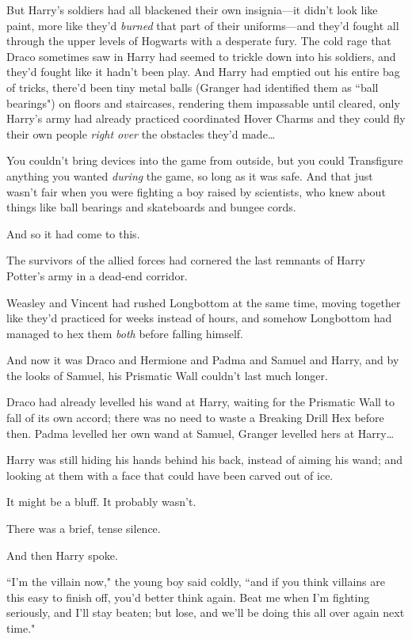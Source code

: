 But Harry's soldiers had all blackened their own insignia—it didn't look like paint, more like they'd \emph{burned} that part of their uniforms—and they'd fought all through the upper levels of Hogwarts with a desperate fury. The cold rage that Draco sometimes saw in Harry had seemed to trickle down into his soldiers, and they'd fought like it hadn't been play. And Harry had emptied out his entire bag of tricks, there'd been tiny metal balls (Granger had identified them as ``ball bearings") on floors and staircases, rendering them impassable until cleared, only Harry's army had already practiced coordinated Hover Charms and they could fly their own people \emph{right over} the obstacles they'd made{\ldots}

You couldn't bring devices into the game from outside, but you could Transfigure anything you wanted \emph{during} the game, so long as it was safe. And that just wasn't fair when you were fighting a boy raised by scientists, who knew about things like ball bearings and skateboards and bungee cords.

And so it had come to this.

The survivors of the allied forces had cornered the last remnants of Harry Potter's army in a dead-end corridor.

Weasley and Vincent had rushed Longbottom at the same time, moving together like they'd practiced for weeks instead of hours, and somehow Longbottom had managed to hex them \emph{both} before falling himself.

And now it was Draco and Hermione and Padma and Samuel and Harry, and by the looks of Samuel, his Prismatic Wall couldn't last much longer.

Draco had already levelled his wand at Harry, waiting for the Prismatic Wall to fall of its own accord; there was no need to waste a Breaking Drill Hex before then. Padma levelled her own wand at Samuel, Granger levelled hers at Harry{\ldots}

Harry was still hiding his hands behind his back, instead of aiming his wand; and looking at them with a face that could have been carved out of ice.

It might be a bluff. It probably wasn't.

There was a brief, tense silence.

And then Harry spoke.

``I'm the villain now," the young boy said coldly, ``and if you think villains are this easy to finish off, you'd better think again. Beat me when I'm fighting seriously, and I'll stay beaten; but lose, and we'll be doing this all over again next time."

